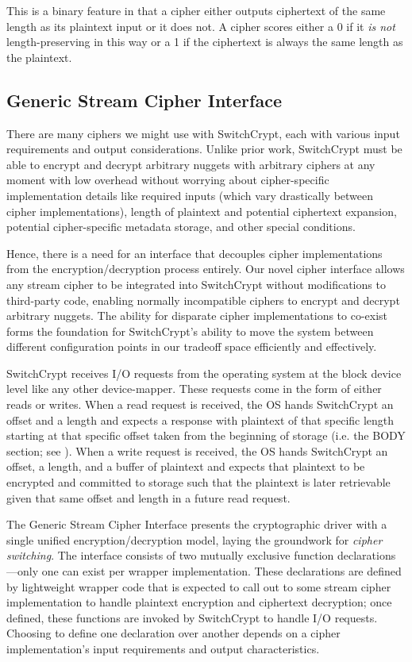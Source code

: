 This is a binary feature in that a cipher either outputs ciphertext of the same
length as its plaintext input or it does not. A cipher scores either a 0 if it
\emph{is not} length-preserving in this way or a 1 if the ciphertext is always
the same length as the plaintext.

\subsection{Generic Stream Cipher Interface} \label{subsec:interface}

There are many ciphers we might use with SwitchCrypt, each with various input
requirements and output considerations. Unlike prior work, SwitchCrypt must be
able to encrypt and decrypt arbitrary nuggets with arbitrary ciphers at any
moment with low overhead without worrying about cipher-specific implementation
details like required inputs (which vary drastically between cipher
implementations), length of plaintext and potential ciphertext expansion,
potential cipher-specific metadata storage, and other special conditions.

Hence, there is a need for an interface that decouples cipher implementations
from the encryption/decryption process entirely. Our novel cipher interface
allows any stream cipher to be integrated into SwitchCrypt without modifications
to third-party code, enabling normally incompatible ciphers to encrypt and
decrypt arbitrary nuggets. The ability for disparate cipher implementations to
co-exist forms the foundation for SwitchCrypt's ability to move the system
between different configuration points in our tradeoff space efficiently and
effectively.

SwitchCrypt receives I/O requests from the operating system at the block device
level like any other device-mapper. These requests come in the form of either
reads or writes. When a read request is received, the OS hands SwitchCrypt an
offset and a length and expects a response with plaintext of that specific
length starting at that specific offset taken from the beginning of storage
(i.e. the BODY section; see ). When a write request is
received, the OS hands SwitchCrypt an offset, a length, and a buffer of
plaintext and expects that plaintext to be encrypted and committed to storage
such that the plaintext is later retrievable given that same offset and length
in a future read request.

The Generic Stream Cipher Interface presents the cryptographic driver with a
single unified encryption/decryption model, laying the groundwork for
\emph{cipher switching}. The interface consists of two mutually exclusive
function declarations---only one can exist per wrapper implementation. These
declarations are defined by lightweight wrapper code that is expected to call
out to some stream cipher implementation to handle plaintext encryption and
ciphertext decryption; once defined, these functions are invoked by SwitchCrypt
to handle I/O requests. Choosing to define one declaration over another depends
on a cipher implementation's input requirements and output characteristics.


